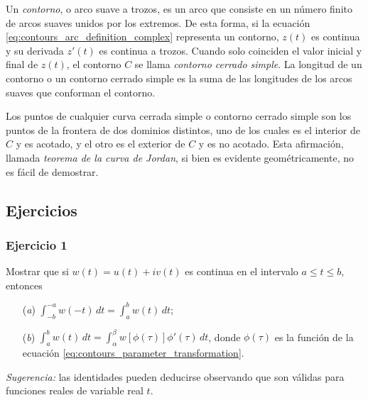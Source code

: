 \documentclass[a4paper]{report}
\begin{document}
Un \emph{contorno}, o arco suave a trozos, es un arco que consiste en un número finito de arcos suaves unidos por los extremos. De esta forma, si la ecuación \ref{eq:contours_arc_definition_complex} representa un contorno, \(z(t)\) es continua y su derivada \(z'(t)\) es continua a trozos. Cuando solo coinciden el valor inicial y final de \(z(t)\), el contorno \(C\) se llama \emph{contorno cerrado simple}. La longitud de un contorno o un contorno cerrado simple es la suma de las longitudes de los arcos suaves que conforman el contorno.

Los puntos de cualquier curva cerrada simple o contorno cerrado simple son los puntos de la frontera de dos dominios distintos, uno de los cuales es el interior de \(C\) y es acotado, y el otro es el exterior de \(C\) y es no acotado. Esta afirmación, llamada \emph{teorema de la curva de Jordan}, si bien es evidente geométricamente, no es fácil de demostrar.

\subsection*{Ejercicios}

\subsubsection{Ejercicio 1}

Mostrar que si \(w(t)=u(t)+iv(t)\) es continua en el intervalo \(a\leq t\leq b\), entonces
\begin{enumerate}
 \item[(\textit{a})] \(\displaystyle\int_{-b}^{-a}w(-t)\,dt=\int_{a}^{b}w(t)\,dt\);
 \item[(\textit{b})] \(\displaystyle\int_{a}^{b}w(t)\,dt=\int_\alpha^\beta w[\phi(\tau)]\phi'(\tau)\,dt\), donde \(\phi(\tau)\) es la función de la ecuación \ref{eq:contours_parameter_transformation}.
\end{enumerate}

\emph{Sugerencia:} las identidades pueden deducirse observando que son válidas para funciones reales de variable real \(t\).
\end{document}
